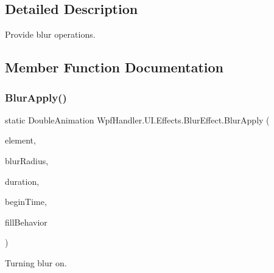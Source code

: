 \subsection{Detailed Description}
Provide blur operations. 



\subsection{Member Function Documentation}
\mbox{\label{class_wpf_handler_1_1_u_i_1_1_effects_1_1_blur_effect_a4f7eaa622e8bc4226f865a7f9afa5d07}} 
\subsubsection{\texorpdfstring{Blur\+Apply()}{BlurApply()}\hspace{0.1cm}{\footnotesize\ttfamily [1/2]}}
{\footnotesize\ttfamily static Double\+Animation Wpf\+Handler.\+U\+I.\+Effects.\+Blur\+Effect.\+Blur\+Apply (\begin{DoxyParamCaption}\item[{U\+I\+Element}]{element,  }\item[{double}]{blur\+Radius,  }\item[{Time\+Span}]{duration,  }\item[{Time\+Span}]{begin\+Time,  }\item[{Fill\+Behavior}]{fill\+Behavior }\end{DoxyParamCaption})\hspace{0.3cm}{\ttfamily [static]}}



Turning blur on. 


